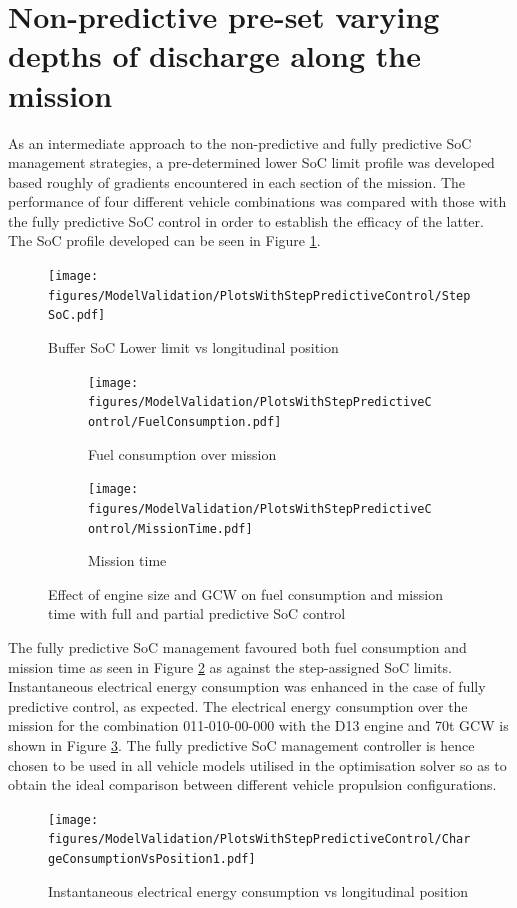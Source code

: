 \documentclass[ExampleMasters.tex]{subfiles}
\begin{document}
\section{Non-predictive pre-set varying depths of discharge along the mission}
As an intermediate approach to the non-predictive and fully predictive SoC management strategies, a pre-determined lower SoC limit profile was developed based roughly of gradients encountered in each section of the mission. The performance of four different vehicle combinations was compared with those with the fully predictive SoC control in order to establish the efficacy of the latter. The SoC profile developed can be seen in Figure \ref{stepSoC}.\\
\begin{figure}[h!]
\centering
\texttt{[image: figures/ModelValidation/PlotsWithStepPredictiveControl/StepSoC.pdf]}
\caption{Buffer SoC Lower limit vs longitudinal position}
\label{stepSoC}
\end{figure}
\begin{figure}[h!]
\begin{subfigure}{.5\textwidth}
\centering
\texttt{[image: figures/ModelValidation/PlotsWithStepPredictiveControl/FuelConsumption.pdf]}
\caption{Fuel consumption over mission}
\end{subfigure}
\begin{subfigure}{.5\textwidth}
\centering
\texttt{[image: figures/ModelValidation/PlotsWithStepPredictiveControl/MissionTime.pdf]}
\caption{Mission time}
\end{subfigure}
\caption{Effect of engine size and GCW on fuel consumption and mission time with full and partial predictive SoC control}
\label{timeFuelAxleEngineStepSoC}
\end{figure}
The fully predictive SoC management favoured both fuel consumption and mission time as seen in Figure \ref{timeFuelAxleEngineStepSoC} as against the step-assigned SoC limits. Instantaneous electrical energy consumption was enhanced in the case of fully predictive control, as expected. The electrical energy consumption over the mission for the combination 011-010-00-000 with the D13 engine and 70t GCW is shown in Figure \ref{electricalEnergyConsumptionStepSoC}. The fully predictive SoC management controller is hence chosen to be used in all vehicle models utilised in the optimisation solver so as to obtain the ideal comparison between different vehicle propulsion configurations.\\
\begin{figure}[h!]
\centering
\texttt{[image: figures/ModelValidation/PlotsWithStepPredictiveControl/ChargeConsumptionVsPosition1.pdf]}
\caption{Instantaneous electrical energy consumption vs longitudinal position}
\label{electricalEnergyConsumptionStepSoC}
\end{figure}
\end{document}
